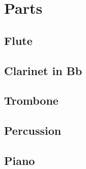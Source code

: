 \section{Parts}
\begin{center}
\fancyhf{} %
\renewcommand{\headrulewidth}{0pt} %
\rfoot{\thepage}
\pagestyle{plain}

\pagebreak

\subsection{Flute}
\begin{center}
 
\pagebreak
\end{center}

\pagebreak

\subsection{Clarinet in Bb}
\begin{center}
 
\pagebreak
\end{center}

\pagebreak

\subsection{Trombone}
\begin{center}
 
\pagebreak
\end{center}

\pagebreak

\subsection{Percussion}
\begin{center}
 
\pagebreak
\end{center}

\pagebreak

\subsection{Piano}
\begin{center}
 
\pagebreak
\end{center}


\end{center}
